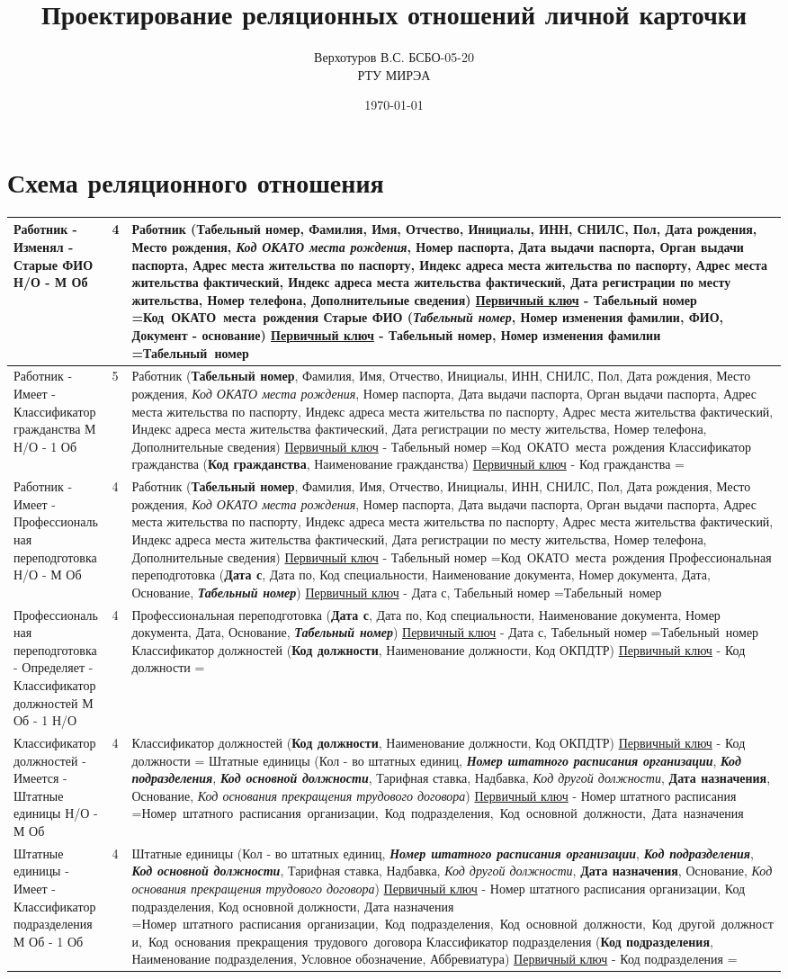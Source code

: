 \documentclass[10pt, a4paper]{article}
\title{Проектирование реляционных отношений личной карточки}
\author{Верхотуров В.С. БСБО-05-20 \\ РТУ МИРЭА}
\date\today
\newcommand{\pk}[1]{\textbf{#1}}
\newcommand{\fk}[1]{\textit{#1}}
\newcommand{\pfk}[1]{\pk{\fk{#1}}}
\newcommand{\firstColumn}[4]{#1 - \newline #2 - \newline #3 \newline\newline #4}
\newcommand{\thirdColumn}[6]{
#1 \newline 
\underline{Первичный ключ} - #2 \newline 
\setbox0=\hbox{#3\unskip}\ifdim\wd0=0pt
\else
  \underline{Внешний(е) ключ(-и)}: #3 \newline
\fi
#4 \newline 
\underline{Первичный ключ} - #5 \newline
\setbox0=\hbox{#6\unskip}\ifdim\wd0=0pt
\else
  \underline{Внешний(е) ключ(-и)}: #6 \newline
\fi
}
\newcommand\ruleOneOptionalManyMondatoryNum{4}
\newcommand\ruleOneOptionalManyMondatory{1 Н/О - М Об}
\newcommand\ruleManyMondatoryOneOptionalNum{4}
\newcommand\ruleManyMondatoryOneOptional{М Об - 1 Н/О}
\newcommand\ruleManyMondatoryOneMondatoryNum{4}
\newcommand\ruleManyMondatoryOneMondatory{М Об - 1 Об}
\newcommand\ruleManyOptionalOneMondatoryNum{5}
\newcommand\ruleManyOptionalOneMondatory{М Н/О - 1 Об}
\newcommand\rabotnik{Работник (\pk{Табельный номер}, Фамилия, Имя, Отчество, Инициалы, ИНН, СНИЛС, Пол, Дата рождения, Место рождения, \fk{Код ОКАТО места рождения}, Номер паспорта, Дата выдачи паспорта, Орган выдачи паспорта, Адрес места жительства по паспорту, Индекс адреса места жительства по паспорту, Адрес места жительства фактический, Индекс адреса места жительства фактический, Дата регистрации по месту жительства, Номер телефона, Дополнительные сведения)}
\newcommand\rabotnikPK{Табельный номер}
\newcommand\rabotnikFK{Код ОКАТО места рождения}
\newcommand\starieFIO{Старые ФИО (\pfk{Табельный номер}, \pk{Номер изменения фамилии}, ФИО, Документ - основание)}
\newcommand\starieFIOPK{Табельный номер, Номер изменения фамилии}
\newcommand\starieFIOFK{Табельный номер}
\newcommand\kGrazhdanstva{Классификатор гражданства (\pk{Код гражданства}, Наименование гражданства)}
\newcommand\kGrazhdanstvaPK{Код гражданства}
\newcommand\kGrazhdanstvaFK{}
\newcommand\shtatnoyeRaspisanieOrganizatsiiPK{Номер штатного расписания}
\newcommand\kPodrazdeleniya{Классификатор подразделения (\pk{Код подразделения}, Наименование подразделения, Условное обозначение, Аббревиатура)}
\newcommand\kPodrazdeleniyaPK{Код подразделения}
\newcommand\kPodrazdeleniyaFK{}
\newcommand\kDolzhostey{Классификатор должностей (\pk{Код должности}, Наименование должности, Код ОКПДТР)}
\newcommand\kDolzhosteyPK{Код должности}
\newcommand\kDolzhosteyFK{}
\newcommand\shtatnieEdinitsi{Штатные единицы (Кол - во штатных единиц, \pfk{Номер штатного расписания организации}, \pfk{Код подразделения}, \pfk{Код основной должности}, Тарифная ставка, Надбавка, \fk{Код другой должности}, \pk{Дата назначения}, Основание, \fk{Код основания прекращения трудового договора})}
\newcommand\shtatnieEdinitsiPK{Номер штатного расписания организации, Код подразделения, Код основной должности, Дата назначения}
\newcommand\shtatnieEdinitsiFK{Номер штатного расписания организации, Код подразделения, Код основной должности, Код другой должности, Код основания прекращения трудового договора}
\newcommand\professionalnayaPerepodgatovka{Профессиональная переподготовка (\pk{Дата с}, Дата по, Код специальности, Наименование документа, Номер документа, Дата, Основание, \pfk{Табельный номер})}
\newcommand\professionalnayaPerepodgatovkaPK{Дата с, Табельный номер}
\newcommand\professionalnayaPerepodgatovkaFK{Табельный номер}
\begin{document}
\maketitle

\section{Схема реляционного отношения}

\begin{center}
\begin{longtable}{ | m{3cm} | m{.1cm}| m{11cm} | }
 
 \hline
 \firstColumn{Работник}{Изменял}{Старые ФИО}{\ruleOneOptionalManyMondatory} & \ruleOneOptionalManyMondatoryNum & \thirdColumn{\rabotnik}{\rabotnikPK}{\rabotnikFK}{\starieFIO}{\starieFIOPK}{\starieFIOFK} \\ 
 
 \hline
 \firstColumn{Работник}{Имеет}{Классификатор гражданства}{\ruleManyOptionalOneMondatory} & \ruleManyOptionalOneMondatoryNum & \thirdColumn{\rabotnik}{\rabotnikPK}{\rabotnikFK}{\kGrazhdanstva}{\kGrazhdanstvaPK}{\kGrazhdanstvaFK} \\ 
 
 \hline
 \firstColumn{Работник}{Имеет}{Профессиональная переподготовка}{\ruleOneOptionalManyMondatory} & \ruleOneOptionalManyMondatoryNum & \thirdColumn{\rabotnik}{\rabotnikPK}{\rabotnikFK}{\professionalnayaPerepodgatovka}{\professionalnayaPerepodgatovkaPK}{\professionalnayaPerepodgatovkaFK} \\ 
 
 \hline
 \firstColumn{Профессиональная переподготовка}{Определяет}{Классификатор должностей}{\ruleManyMondatoryOneOptional} & \ruleManyMondatoryOneOptionalNum & \thirdColumn{\professionalnayaPerepodgatovka}{\professionalnayaPerepodgatovkaPK}{\professionalnayaPerepodgatovkaFK}{\kDolzhostey}{\kDolzhosteyPK}{\kDolzhosteyFK} \\ 
 
 \hline
 \firstColumn{Классификатор должностей}{Имеется}{Штатные единицы}{\ruleOneOptionalManyMondatory} & \ruleOneOptionalManyMondatoryNum & \thirdColumn{\kDolzhostey}{\kDolzhosteyPK}{\kDolzhosteyFK}{\shtatnieEdinitsi}{\shtatnoyeRaspisanieOrganizatsiiPK}{\shtatnieEdinitsiPK} \\ 
 
 \hline
 \firstColumn{Штатные единицы}{Имеет}{Классификатор подразделения}{\ruleManyMondatoryOneMondatory} & \ruleManyMondatoryOneMondatoryNum & \thirdColumn{\shtatnieEdinitsi}{\shtatnieEdinitsiPK}{\shtatnieEdinitsiFK}{\kPodrazdeleniya}{\kPodrazdeleniyaPK}{\kPodrazdeleniyaFK} \\ 
 

\end{longtable}
\end{center}
\end{document}
